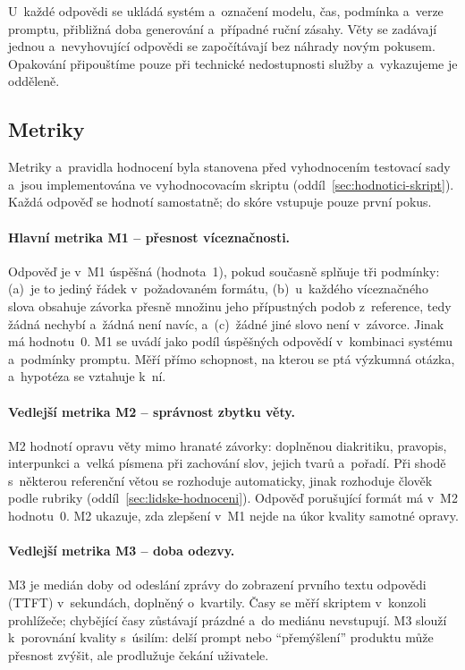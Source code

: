 \documentclass[11pt,a4paper]{article}
\begin{document}
U~každé odpovědi se ukládá systém a~označení modelu, čas, podmínka
a~verze promptu, přibližná doba generování a~případné ruční zásahy.
Věty se zadávají jednou a~nevyhovující odpovědi se započítávají bez
náhrady novým pokusem. Opakování připouštíme pouze při technické
nedostupnosti služby a~vykazujeme je odděleně.




\subsection{Metriky}
\label{sec:metriky}

Metriky a~pravidla hodnocení byla stanovena před vyhodnocením testovací
sady a~jsou implementována ve vyhodnocovacím skriptu
(oddíl~\ref{sec:hodnotici-skript}). Každá odpověď se hodnotí
samostatně; do skóre vstupuje pouze první pokus.

\paragraph{Hlavní metrika M1 -- přesnost víceznačnosti.}
Odpověď je v~M1 úspěšná (hodnota~1), pokud současně splňuje tři
podmínky: (a)~je to jediný řádek v~požadovaném formátu, (b)~u~každého
víceznačného slova obsahuje závorka přesně množinu jeho přípustných
podob z~reference, tedy žádná nechybí a~žádná není navíc, a~(c)~žádné
jiné slovo není v~závorce. Jinak má hodnotu~0. M1 se uvádí jako podíl
úspěšných odpovědí v~kombinaci systému a~podmínky promptu. Měří přímo
schopnost, na kterou se ptá výzkumná otázka, a~hypotéza se vztahuje
k~ní.

\paragraph{Vedlejší metrika M2 -- správnost zbytku věty.}
M2 hodnotí opravu věty mimo hranaté závorky: doplněnou diakritiku,
pravopis, interpunkci a~velká písmena při zachování slov, jejich tvarů
a~pořadí. Při shodě s~některou referenční větou se rozhoduje
automaticky, jinak rozhoduje člověk podle rubriky
(oddíl~\ref{sec:lidske-hodnoceni}). Odpověď porušující formát má
v~M2 hodnotu~0. M2 ukazuje, zda zlepšení v~M1 nejde na úkor kvality
samotné opravy.

\paragraph{Vedlejší metrika M3 -- doba odezvy.}
M3 je medián doby od odeslání zprávy do zobrazení prvního textu
odpovědi (TTFT) v~sekundách, doplněný o~kvartily. Časy se měří
skriptem v~konzoli prohlížeče; chybějící časy zůstávají prázdné a~do
mediánu nevstupují. M3 slouží k~porovnání kvality s~úsilím: delší
prompt nebo \enquote{přemýšlení} produktu může přesnost zvýšit, ale
prodlužuje čekání uživatele.
\end{document}
